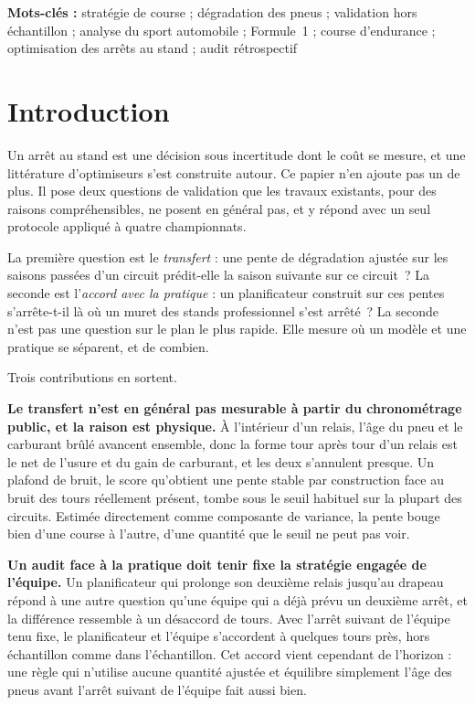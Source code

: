 \documentclass[11pt,a4paper]{article}
\begin{document}
\vspace{0.6em}
\noindent\textbf{Mots-clés :} stratégie de course ; dégradation des pneus ;
validation hors échantillon ; analyse du sport automobile ; Formule~1 ; course
d'endurance ; optimisation des arrêts au stand ; audit rétrospectif

\section{Introduction}

Un arrêt au stand est une décision sous incertitude dont le coût se mesure, et
une littérature d'optimiseurs s'est construite autour. Ce papier n'en ajoute pas
un de plus. Il pose deux questions de validation que les travaux existants, pour
des raisons compréhensibles, ne posent en général pas, et y répond avec un seul
protocole appliqué à quatre championnats.

La première question est le \emph{transfert} : une pente de dégradation ajustée
sur les saisons passées d'un circuit prédit-elle la saison suivante sur ce
circuit~? La seconde est l'\emph{accord avec la pratique} : un planificateur
construit sur ces pentes s'arrête-t-il là où un muret des stands professionnel
s'est arrêté~? La seconde n'est pas une question sur le plan le plus rapide.
Elle mesure où un modèle et une pratique se séparent, et de combien.

Trois contributions en sortent.

\textbf{Le transfert n'est en général pas mesurable à partir du chronométrage
public, et la raison est physique.} À l'intérieur d'un relais, l'âge du pneu et
le carburant brûlé avancent ensemble, donc la forme tour après tour d'un relais
est le net de l'usure et du gain de carburant, et les deux s'annulent presque.
Un plafond de bruit, le score qu'obtient une pente stable par construction
face au bruit des tours réellement présent, tombe sous le seuil habituel sur la
plupart des circuits. Estimée directement comme composante de variance, la pente
bouge bien d'une course à l'autre, d'une quantité que le seuil ne peut pas voir.

\textbf{Un audit face à la pratique doit tenir fixe la stratégie engagée de
l'équipe.} Un planificateur qui prolonge son deuxième relais jusqu'au drapeau
répond à une autre question qu'une équipe qui a déjà prévu un deuxième arrêt, et
la différence ressemble à un désaccord de \FoneMedian{} tours. Avec l'arrêt
suivant de l'équipe tenu fixe, le planificateur et l'équipe s'accordent à
quelques tours près, hors échantillon comme dans l'échantillon. Cet accord vient
cependant de l'horizon : une règle qui n'utilise aucune quantité ajustée et
équilibre simplement l'âge des pneus avant l'arrêt suivant de l'équipe fait
aussi bien.
\end{document}

